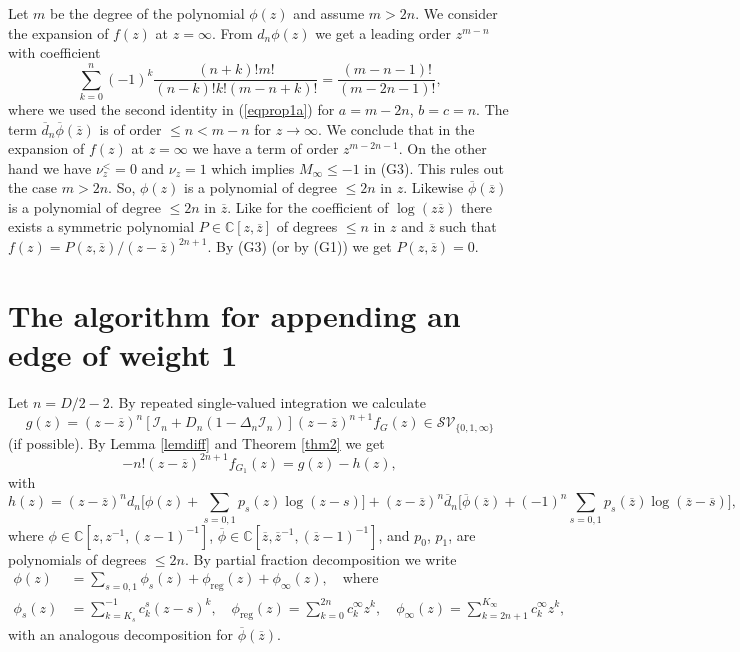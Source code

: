 \documentclass[oneside]{amsart}
\newcommand{\CC}{{\mathbb C}}
\newcommand{\ddd}{{\overline{d}}}
\newcommand{\sss}{{\overline{s}}}
\newcommand{\zz}{{\overline{z}}}
\newcommand{\sI}{\mathcal{I}}
\newcommand{\sS}{\mathcal{S}}
\newcommand{\sV}{\mathcal{V}}
\theoremstyle{plain}
\begin{document}
Let $m$ be the degree of the polynomial $\phi(z)$ and assume $m>2n$. We consider the expansion of $f(z)$ at $z=\infty$.
From $d_n\phi(z)$ we get a leading order $z^{m-n}$ with coefficient
$$
\sum_{k=0}^n(-1)^k\frac{(n+k)!m!}{(n-k)!k!(m-n+k)!}=\frac{(m-n-1)!}{(m-2n-1)!},
$$
where we used the second identity in (\ref{eqprop1a}) for $a=m-2n$, $b=c=n$. The term $\ddd_n\overline{\phi}(\zz)$ is of order $\leq n<m-n$ for $z\to\infty$.
We conclude that in the expansion of $f(z)$ at $z=\infty$ we have a term of order $z^{m-2n-1}$. 
On the other hand we have $\nu_z^<=0$ and $\nu_z=1$ which implies $M_\infty\leq-1$ in (G3). This rules out the case $m>2n$. So, $\phi(z)$ is a polynomial of degree $\leq2n$ in $z$.
Likewise $\overline{\phi}(\zz)$ is a polynomial of degree $\leq2n$ in $\zz$. Like for the coefficient of $\log(z\zz)$ there exists a symmetric polynomial $P\in\CC[z,\zz]$
of degrees $\leq n$ in $z$ and $\zz$ such that $f(z)=P(z,\zz)/(z-\zz)^{2n+1}$. By (G3) (or by (G1)) we get $P(z,\zz)=0$.

\section{The algorithm for appending an edge of weight 1}\label{sectappalg}
Let $n=D/2-2$. By repeated single-valued integration we calculate
\begin{equation}
g(z)=(z-\zz)^n[\sI_n+D_n(1-\Delta_n\sI_n)](z-\zz)^{n+1}f_G(z)\in\sS\sV_{\{0,1,\infty\}}
\end{equation}
(if possible). By Lemma \ref{lemdiff} and Theorem \ref{thm2} we get
\begin{equation}\label{solution1}
-n!(z-\zz)^{2n+1}f_{G_1}(z)=g(z)-h(z),
\end{equation}
with
\begin{equation}\label{solution2}
h(z)=(z-\zz)^nd_n\Big[\phi(z)+\sum_{s=0,1}p_s(z)\log(z-s)\Big]+(z-\zz)^n\ddd_n\Big[\overline{\phi}(\zz)+(-1)^n\sum_{s=0,1}p_s(\zz)\log(\zz-\sss)\Big],
\end{equation}
where $\phi\in\CC[z,z^{-1},(z-1)^{-1}]$, $\overline{\phi}\in\CC[\zz,\zz^{-1},(\zz-1)^{-1}]$, and $p_0$, $p_1$, are polynomials of degrees $\leq2n$.
By partial fraction decomposition we write
\begin{align}\label{solution3}
\phi(z)&=\sum_{s=0,1}\phi_s(z)+\phi_\text{reg}(z)+\phi_\infty(z),\quad\text{where}\nonumber\\
\phi_s(z)&=\sum_{k=K_s}^{-1}c_k^s(z-s)^k,\quad\phi_\text{reg}(z)=\sum_{k=0}^{2n}c_k^\infty z^k,\quad\phi_\infty(z)=\sum_{k=2n+1}^{K_\infty}c_k^\infty z^k,
\end{align}
with an analogous decomposition for $\overline{\phi}(\zz)$.
\end{document}
